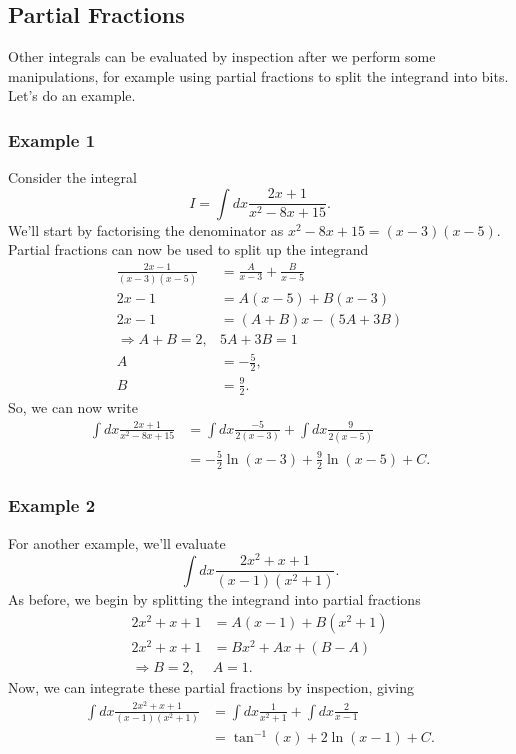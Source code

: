 \documentclass{article}
\begin{document}
\subsection{Partial Fractions}

Other integrals can be evaluated by inspection after we perform some manipulations, for example using partial fractions to split the integrand into bits.
Let's do an example.

\subsubsection*{Example 1}

Consider the integral
\begin{equation}
	I = \int dx \frac{2x + 1}{x^2 - 8x + 15} .
\end{equation}
We'll start by factorising the denominator as $x^2 - 8x + 15 = (x-3)(x-5)$.
Partial fractions can now be used to split up the integrand
\begin{align*}
	\frac{2x-1}{(x-3)(x-5)} &= \frac{A}{x-3} + \frac{B}{x-5} \\
	2x-1 &= A (x-5) + B(x-3) \\
	2x -1 &= (A+B) x - (5A + 3B) \\
	\Rightarrow A+B = 2,& 5A + 3B = 1 \\
	A &= -\frac{5}{2}, \\
	B &= \frac{9}{2} .
\end{align*}
So, we can now write
\begin{align*}
	\int dx \frac{2x + 1}{x^2 - 8x + 15} &= \int dx \frac{-5}{2(x-3)} + \int dx \frac{9}{2(x-5)} \\
	&= -\frac{5}{2} \ln (x-3) + \frac{9}{2} \ln (x-5) + C.
\end{align*}

\subsubsection*{Example 2}

For another example, we'll evaluate 
\begin{equation}
	\int dx \frac{2x^2 + x + 1}{(x-1)(x^2 +1)} .
\end{equation}
As before, we begin by splitting the integrand into partial fractions
\begin{align*}
	2x^2 + x + 1 &= A(x-1) + B(x^2+1) \\
	2x^2 + x + 1 &= B x^2 + A x + (B-A) \\
	\Rightarrow B = 2, & A = 1 .
\end{align*}
Now, we can integrate these partial fractions by inspection, giving
\begin{align*}
	\int dx \frac{2x^2 + x + 1}{(x-1)(x^2 +1)} &= \int dx \frac{1}{x^2 + 1} + \int dx \frac{2}{x-1} \\
	&= \tan^{-1} (x) + 2 \ln (x-1) + C.
\end{align*}
\end{document}
